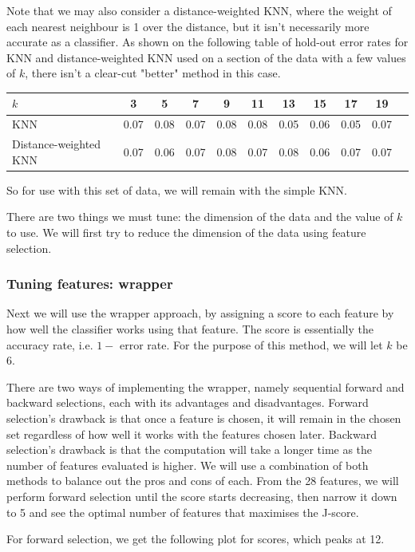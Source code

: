 \documentclass[11pt, a4paper]{article}
\begin{document}
Note that we may also consider a distance-weighted KNN, where the weight of each nearest neighbour is 1 over the distance, but it isn't necessarily more accurate as a classifier. As shown on the following table of hold-out error rates for KNN and distance-weighted KNN used on a section of the data with a few values of $k$, there isn't a clear-cut "better" method in this case.

\begin{tabular}{| l | c | c | c | c | c | c | c | c | c | c |}
\hline
  $k$ & 3 & 5 & 7 & 9 & 11 & 13 & 15 & 17 & 19 \\\hline
  KNN & 0.07 &0.08& 0.07& 0.08& 0.08& 0.05& 0.06& 0.05& 0.07\\\hline
  Distance-weighted KNN & 0.07 &0.06& 0.07& 0.08& 0.07& 0.08& 0.06& 0.07& 0.07 \\\hline
\end{tabular}


So for use with this set of data, we will remain with the simple KNN.

There are two things we must tune: the dimension of the data and the value of $k$ to use. We will first try to reduce the dimension of the data using feature selection. 


\subsubsection{Tuning features: wrapper}
Next we will use the wrapper approach, by assigning a score to each feature by how well the classifier works using that feature. The score is essentially the accuracy rate, i.e. $1 -$ error rate. For the purpose of this method, we will let $k$ be 6.

There are two ways of implementing the wrapper, namely sequential forward and backward selections, each with its advantages and disadvantages. Forward selection's drawback is that once a feature is chosen, it will remain in the chosen set regardless of how well it works with the features chosen later. Backward selection's drawback is that the computation will take a longer time as the number of features evaluated is higher. We will use a combination of both methods to balance out the pros and cons of each. From the 28 features, we will perform forward selection until the score starts decreasing, then narrow it down to 5 and see the optimal number of features that maximises the J-score.

For forward selection, we get the following plot for scores, which peaks at 12. 
\end{document}
